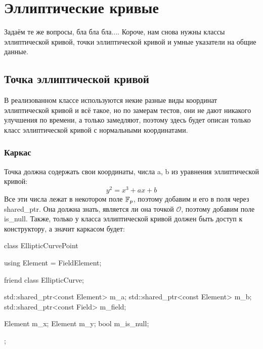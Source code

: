 
\section{Эллиптические кривые}
Задаём те же вопросы, бла бла бла.... Короче, нам снова нужны классы эллиптической кривой, точки эллиптической кривой и умные указатели на общие данные.
\subsection{Точка эллиптической кривой}
В реализованном классе используются некие разные виды координат эллиптической кривой и всё такое, но по замерам тестов, они не дают никакого улучшения по времени, а только замедляют, поэтому здесь будет описан только класс эллиптической кривой с нормальными координатами.

\subsubsection{Каркас}
Точка должна содержать свои координаты, числа a, b из уравнения эллиптической кривой:
\[y^2 = x^3 + ax +b\]
Все эти числа лежат в некотором поле $\mathbb F_p$, поэтому добавим и его в поля через shared\_ptr. Она должна знать, является ли она точкой $\mathcal{O}$, поэтому добавим поле is\_null. Также, только у класса эллиптической кривой должен быть доступ к конструктору, а значит каркасом будет:
\begin{cppcode}
class EllipticCurvePoint {
    using Element = FieldElement;

    friend class EllipticCurve;

    std::shared_ptr<const Element> m_a;
    std::shared_ptr<const Element> m_b;
    std::shared_ptr<const Field> m_field;

    Element m_x;
    Element m_y;
    bool m_is_null;
};
\end{cppcode}
